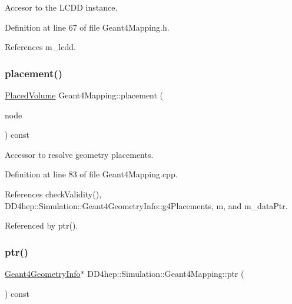 Accesor to the L\+C\+DD instance. 



Definition at line 67 of file Geant4\+Mapping.\+h.



References m\+\_\+lcdd.

\hypertarget{class_d_d4hep_1_1_simulation_1_1_geant4_mapping_a833a8b3dcf5923684cfbf51fc4cc2eea}{}\label{class_d_d4hep_1_1_simulation_1_1_geant4_mapping_a833a8b3dcf5923684cfbf51fc4cc2eea} 
\subsubsection{\texorpdfstring{placement()}{placement()}}
{\footnotesize\ttfamily \hyperlink{class_d_d4hep_1_1_simulation_1_1_geant4_mapping_a2cad95da5f969a6b67fb6d6944549ad6}{Placed\+Volume} Geant4\+Mapping\+::placement (\begin{DoxyParamCaption}\item[{const G4\+V\+Physical\+Volume $\ast$}]{node }\end{DoxyParamCaption}) const}



Accessor to resolve geometry placements. 



Definition at line 83 of file Geant4\+Mapping.\+cpp.



References check\+Validity(), D\+D4hep\+::\+Simulation\+::\+Geant4\+Geometry\+Info\+::g4\+Placements, m, and m\+\_\+data\+Ptr.



Referenced by ptr().

\hypertarget{class_d_d4hep_1_1_simulation_1_1_geant4_mapping_a8b2d3c35a3daa1676bd2a79cb217d5e5}{}\label{class_d_d4hep_1_1_simulation_1_1_geant4_mapping_a8b2d3c35a3daa1676bd2a79cb217d5e5} 
\subsubsection{\texorpdfstring{ptr()}{ptr()}}
{\footnotesize\ttfamily \hyperlink{class_d_d4hep_1_1_simulation_1_1_geant4_geometry_info}{Geant4\+Geometry\+Info}$\ast$ D\+D4hep\+::\+Simulation\+::\+Geant4\+Mapping\+::ptr (\begin{DoxyParamCaption}{ }\end{DoxyParamCaption}) const\hspace{0.3cm}{\ttfamily [inline]}}




